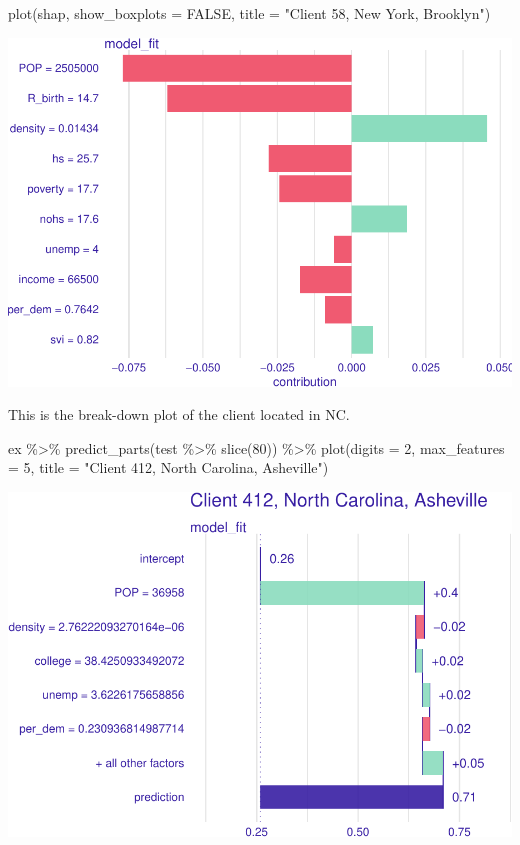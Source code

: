 \documentclass[
]{article}
\newenvironment{Shaded}{\begin{snugshade}}{\end{snugshade}}
\newcommand{\AttributeTok}[1]{\textcolor[rgb]{0.77,0.63,0.00}{#1}}
\newcommand{\ConstantTok}[1]{\textcolor[rgb]{0.00,0.00,0.00}{#1}}
\newcommand{\DecValTok}[1]{\textcolor[rgb]{0.00,0.00,0.81}{#1}}
\newcommand{\FunctionTok}[1]{\textcolor[rgb]{0.00,0.00,0.00}{#1}}
\newcommand{\NormalTok}[1]{#1}
\newcommand{\SpecialCharTok}[1]{\textcolor[rgb]{0.00,0.00,0.00}{#1}}
\newcommand{\StringTok}[1]{\textcolor[rgb]{0.31,0.60,0.02}{#1}}
\begin{document}
\begin{Shaded}
\begin{Highlighting}[]
\FunctionTok{plot}\NormalTok{(shap, }\AttributeTok{show\_boxplots =} \ConstantTok{FALSE}\NormalTok{, }\AttributeTok{title =} \StringTok{"Client 58, New York, Brooklyn"}\NormalTok{)}
\end{Highlighting}
\end{Shaded}

\includegraphics{figures/report/fig-unnamed-chunk-31-1.pdf}

This is the break-down plot of the client located in NC.

\begin{Shaded}
\begin{Highlighting}[]
\NormalTok{ex }\SpecialCharTok{\%\textgreater{}\%}
  \FunctionTok{predict\_parts}\NormalTok{(test }\SpecialCharTok{\%\textgreater{}\%} \FunctionTok{slice}\NormalTok{(}\DecValTok{80}\NormalTok{)) }\SpecialCharTok{\%\textgreater{}\%}
  \FunctionTok{plot}\NormalTok{(}\AttributeTok{digits =} \DecValTok{2}\NormalTok{, }\AttributeTok{max\_features =} \DecValTok{5}\NormalTok{, }\AttributeTok{title =} \StringTok{"Client 412, North Carolina, Asheville"}\NormalTok{)}
\end{Highlighting}
\end{Shaded}

\includegraphics{figures/report/fig-unnamed-chunk-32-1.pdf}
\end{document}
